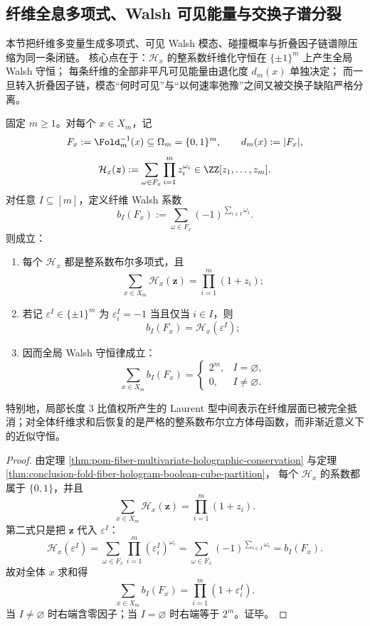 \subsection{纤维全息多项式、Walsh 可见能量与交换子谱分裂}\label{subsec:conclusion-fiber-walsh-energy-topology-factorchain-splitting}
本节把纤维多变量生成多项式、可见 Walsh 模态、碰撞概率与折叠因子链谱隙压缩为同一条闭链。
核心点在于：\(\mathcal H_x\) 的整系数纤维化守恒在 \(\{\pm1\}^m\) 上产生全局 Walsh 守恒；
每条纤维的全部非平凡可见能量由退化度 \(d_m(x)\) 单独决定；
而一旦转入折叠因子链，模态“何时可见”与“以何速率弛豫”之间又被交换子缺陷严格分离。

\begin{proposition}\label{prop:conclusion-fiber-hologram-integrality-global-walsh-conservation}
固定 \(m\ge 1\)。对每个 \(x\in X_m\)，记
\[
F_x:=\Fold_m^{-1}(x)\subseteq \Omega_m=\{0,1\}^m,
\qquad
d_m(x):=|F_x|,
\]
\[
\mathcal H_x(\boldsymbol z):=\sum_{\omega\in F_x}\prod_{i=1}^{m}z_i^{\omega_i}\in \ZZ[z_1,\dots,z_m].
\]
对任意 \(I\subseteq [m]\)，定义纤维 Walsh 系数
\[
b_I(F_x):=\sum_{\omega\in F_x}(-1)^{\sum_{i\in I}\omega_i}.
\]
则成立：
\begin{enumerate}
  \item 每个 \(\mathcal H_x\) 都是整系数布尔多项式，且
  \[
  \sum_{x\in X_m}\mathcal H_x(\boldsymbol z)=\prod_{i=1}^{m}(1+z_i);
  \]
  \item 若记 \(\varepsilon^I\in\{\pm1\}^m\) 为
  \(
  \varepsilon_i^I=-1
  \)
  当且仅当 \(i\in I\)，则
  \[
  b_I(F_x)=\mathcal H_x(\varepsilon^I);
  \]
  \item 因而全局 Walsh 守恒律成立：
  \[
  \sum_{x\in X_m}b_I(F_x)=
  \begin{cases}
  2^m,& I=\varnothing,\\[1ex]
  0,& I\neq \varnothing.
  \end{cases}
  \]
\end{enumerate}
特别地，局部长度 \(3\) 比值权所产生的 Laurent 型中间表示在纤维层面已被完全抵消；对全体纤维求和后恢复的是严格的整系数布尔立方体母函数，而非渐近意义下的近似守恒。
\end{proposition}

\begin{proof}
由定理 \ref{thm:pom-fiber-multivariate-holographic-conservation} 与定理 \ref{thm:conclusion-fold-fiber-hologram-boolean-cube-partition}，
每个 \(\mathcal H_x\) 的系数都属于 \(\{0,1\}\)，并且
\[
\sum_{x\in X_m}\mathcal H_x(\boldsymbol z)=\prod_{i=1}^{m}(1+z_i).
\]
第二式只是把 \(\boldsymbol z\) 代入 \(\varepsilon^I\)：
\[
\mathcal H_x(\varepsilon^I)
=
\sum_{\omega\in F_x}\prod_{i=1}^{m}(\varepsilon_i^I)^{\omega_i}
=
\sum_{\omega\in F_x}(-1)^{\sum_{i\in I}\omega_i}
=
b_I(F_x).
\]
故对全体 \(x\) 求和得
\[
\sum_{x\in X_m}b_I(F_x)
=
\prod_{i=1}^{m}(1+\varepsilon_i^I).
\]
当 \(I\neq\varnothing\) 时右端含零因子；当 \(I=\varnothing\) 时右端等于 \(2^m\)。证毕。
\end{proof}


